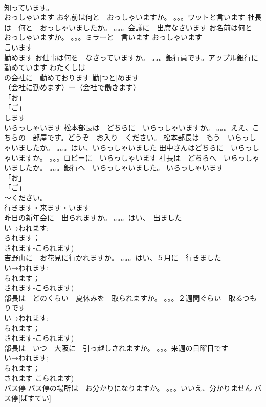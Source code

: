 \documentclass[8pt]{extreport}
\begin{document}
\begin{CJK}{UTF8}{min}
\\	知っています。
\\	おっしゃいます	お名前は何と　おっしゃいますか。 。。。ワットと言います 社長は　何と　おっしゃいましたか。 。。。会議に　出席なさいます お名前は何と　おっしゃいますか。 。。。ミラーと　言います	おっしゃいます				
\\	言います
\\	勤めます	お仕事は何を　なさっていますか。 。。。銀行員です。アップル銀行に勤めています わたくしは　
\\	の会社に　勤めております	勤[つと]めます			
\\	（会社に勤めます）ー（会社で働きます）	
\\	「お」
\\	「ご」
\\	します
\\	いらっしゃいます	松本部長は　どちらに　いらっしゃいますか。 。。。ええ、こちらの　部屋です。どうぞ　お入り　ください。 松本部長は　もう　いらっしゃいましたか。 。。。はい、いらっしゃいました 田中さんはどちらに　いらっしゃいますか。 。。。ロビーに　いらっしゃいます 社長は　どちらへ　いらっしゃいましたか。 。。。銀行へ　いらっしゃいました。	いらっしゃいます				
\\	「お」
\\	「ご」
\\	～ください。	
\\	行きます・来ます・います
\\	昨日の新年会に　出られますか。 。。。はい、　出ました	
\\	い→われます;
\\	られます；
\\	されます-こられます)
\\	吉野山に　お花見に行かれますか。 。。。はい、５月に　行きました	
\\	い→われます;
\\	られます；
\\	されます-こられます)
\\	部長は　どのくらい　夏休みを　取られますか。 。。。２週間ぐらい　取るつもりです	
\\	い→われます;
\\	られます；
\\	されます-こられます)
\\	部長は　いつ　大阪に　引っ越しされますか。 。。。来週の日曜日です	
\\	い→われます;
\\	られます；
\\	されます-こられます)
\\	バス停	バス停の場所は　お分かりになりますか。 。。。いいえ、分かりません	バス停[ばすてい]			

\end{CJK}
\end{document}
